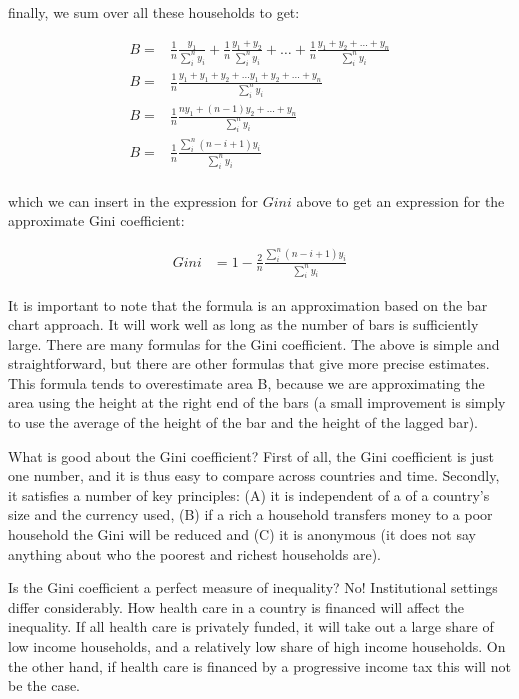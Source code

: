 \documentclass[
]{book}
\begin{document}
finally, we sum over all these households to get:

\begin{align}
  B=&\frac{1}{n}\frac{y_1}{\sum_i^ny_i}+\frac{1}{n}\frac{y_1+y_2}{\sum_i^ny_i}+\dots+\frac{1}{n}\frac{y_1+y_2+\dots+y_n}{\sum_i^ny_i}\nonumber\\
  B=&\frac{1}{n}\frac{y_1+y_1+y_2+\dots y_1+y_2+\dots+y_n}{\sum_i^ny_i}\nonumber\\
  B=&\frac{1}{n}\frac{ny_1+(n-1)y_2+\dots+y_n}{\sum_i^ny_i}\nonumber\\
  B=&\frac{1}{n}\frac{\sum_i^n(n-i+1)y_i}{\sum_i^ny_i}\nonumber\\
\end{align}

which we can insert in the expression for \(Gini\) above to get an expression for the approximate Gini coefficient:

\begin{align}
    Gini&=1-\frac{2}{n}\frac{\sum_i^n(n-i+1)y_i}{\sum_i^ny_i}\nonumber
\end{align}

It is important to note that the formula is an approximation based on the bar chart approach. It will work well as long as the number of bars is sufficiently large. There are many formulas for the Gini coefficient. The above is simple and straightforward, but there are other formulas that give more precise estimates. This formula tends to overestimate area B, because we are approximating the area using the height at the right end of the bars (a small improvement is simply to use the average of the height of the bar and the height of the lagged bar).

What is good about the Gini coefficient? First of all, the Gini coefficient is just one number, and it is thus easy to compare across countries and time. Secondly, it satisfies a number of key principles: (A) it is independent of a of a country's size and the currency used, (B) if a rich a household transfers money to a poor household the Gini will be reduced and (C) it is anonymous (it does not say anything about who the poorest and richest households are).

Is the Gini coefficient a perfect measure of inequality? No! Institutional settings differ considerably. How health care in a country is financed will affect the inequality. If all health care is privately funded, it will take out a large share of low income households, and a relatively low share of high income households. On the other hand, if health care is financed by a progressive income tax this will not be the case.
\end{document}

